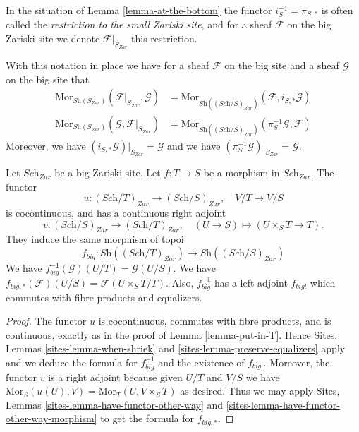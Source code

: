 \begin{definition}
\label{definition-restriction-small-zariski}
In the situation of
Lemma \ref{lemma-at-the-bottom}
the functor $i_S^{-1} = \pi_{S, *}$ is often
called the {\it restriction to the small Zariski site}, and for a sheaf
$\mathcal{F}$ on the big Zariski site we denote $\mathcal{F}|_{S_{Zar}}$
this restriction.
\end{definition}

\noindent
With this notation in place we have for a sheaf $\mathcal{F}$ on the
big site and a sheaf $\mathcal{G}$ on the big site that
\begin{align*}
\text{Mor}_{\textit{Sh}(S_{Zar})}(\mathcal{F}|_{S_{Zar}}, \mathcal{G})
& =
\text{Mor}_{\textit{Sh}((\textit{Sch}/S)_{Zar})}(\mathcal{F},
i_{S,*}\mathcal{G}) \\
\text{Mor}_{\textit{Sh}(S_{Zar})}(\mathcal{G}, \mathcal{F}|_{S_{Zar}})
& =
\text{Mor}_{\textit{Sh}((\textit{Sch}/S)_{Zar})}(\pi_S^{-1}\mathcal{G},
\mathcal{F})
\end{align*}
Moreover, we have $(i_{S,*}\mathcal{G})|_{S_{Zar}} = \mathcal{G}$
and we have $(\pi_S^{-1}\mathcal{G})|_{S_{Zar}} = \mathcal{G}$.

\begin{lemma}
\label{lemma-morphism-big}
Let $\textit{Sch}_{Zar}$ be a big Zariski site.
Let $f : T \to S$ be a morphism in $\textit{Sch}_{Zar}$.
The functor
$$
u : (\textit{Sch}/T)_{Zar} \longrightarrow (\textit{Sch}/S)_{Zar},
\quad
V/T \longmapsto V/S
$$
is cocontinuous, and has a continuous right adjoint
$$
v : (\textit{Sch}/S)_{Zar} \longrightarrow (\textit{Sch}/T)_{Zar},
\quad
(U \to S) \longmapsto (U \times_S T \to T).
$$
They induce the same morphism of topoi
$$
f_{big} :
\textit{Sh}((\textit{Sch}/T)_{Zar})
\longrightarrow
\textit{Sh}((\textit{Sch}/S)_{Zar})
$$
We have $f_{big}^{-1}(\mathcal{G})(U/T) = \mathcal{G}(U/S)$.
We have $f_{big, *}(\mathcal{F})(U/S) = \mathcal{F}(U\times_ST/T)$.
Also, $f_{big}^{-1}$ has a left adjoint $f_{big!}$ which commutes with
fibre products and equalizers.
\end{lemma}

\begin{proof}
The functor $u$ is cocontinuous, commutes with fibre products,
and is continuous, exactly as in the proof of Lemma \ref{lemma-put-in-T}.
Hence Sites, Lemmas \ref{sites-lemma-when-shriek}
and \ref{sites-lemma-preserve-equalizers}
apply and we deduce the formula
for $f_{big}^{-1}$ and the existence of $f_{big!}$. Moreover,
the functor $v$ is a right adjoint because given $U/T$ and $V/S$
we have $\text{Mor}_S(u(U), V) = \text{Mor}_T(U, V\times_S T)$
as desired. Thus we may apply
Sites, Lemmas \ref{sites-lemma-have-functor-other-way} and
\ref{sites-lemma-have-functor-other-way-morphism} to get the
formula for $f_{big, *}$.
\end{proof}

